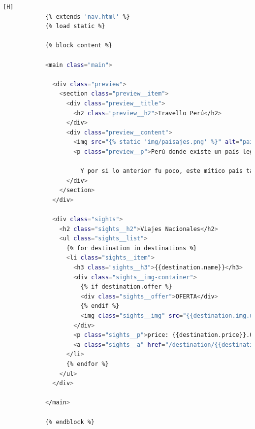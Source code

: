 \documentclass{article}
\begin{document}
            \begin{lstlisting}[language=bash,caption={index.html}][H]
            {% extends 'nav.html' %}
            {% load static %}
            
            {% block content %}
            
            <main class="main">
            
              <div class="preview">
                <section class="preview__item">
                  <div class="preview__title">
                    <h2 class="preview__h2">Travello Perú</h2>
                  </div>
                  <div class="preview__content">
                    <img src="{% static 'img/paisajes.png' %}" alt="paisaje">
                    <p class="preview__p">Perú donde existe un país legendario que posee: fastuosos centros arqueológicos, mágicos sitios naturales y paisajísticos, majestuosos templos precolombinos y coloniales, ancestrales palacios pre-incas e incas, extraordinarios conventos y casonas coloniales, excelentes aguas termo-medicinales, pueblos tradicionales, milenaria cultura, exquisita gastronomía, fina textilería, variada artesanía… y la más grande cultura viva de América.
            
                      Y por si lo anterior fu poco, este mítico país también posee el más grande legado histórico – cultural del Mundo: historia, cultura, gastronomía, aventura, tradición, naturaleza y biodiversidad. Descubre estos lugares.</p>
                  </div>
                </section>
              </div>
            
              <div class="sights">
                <h2 class="sights__h2">Viajes Nacionales</h2>
                <ul class="sights__list">
                  {% for destination in destinations %}
                  <li class="sights__item">
                    <h3 class="sights__h3">{{destination.name}}</h3>
                    <div class="sights__img-container">
                      {% if destination.offer %}
                      <div class="sights__offer">OFERTA</div>
                      {% endif %}
                      <img class="sights__img" src="{{destination.img.url}}" alt="paisaje">
                    </div>
                    <p class="sights__p">price: {{destination.price}}.00$</p>
                    <a class="sights__a" href="/destination/{{destination.id}}">VER</a>
                  </li>
                  {% endfor %}
                </ul>
              </div>
            
            </main>
            
            {% endblock %}
    	\end{lstlisting}
     
\end{document}
